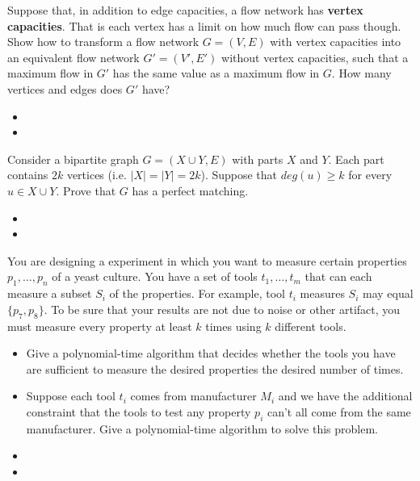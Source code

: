 \documentclass{article}
\newcounter{exercise}
\newcommand{\<}{
    \langle}
\renewcommand{\>}{
    \rangle}
\begin{document}
{\begin{exercise}
Suppose that, in addition to edge capacities, a flow network has \textbf{vertex capacities}.
That is each vertex has a limit on how much flow can pass though. Show how to transform a flow network $G=(V,E)$ with vertex capacities into an equivalent flow network $G'=(V',E')$ without vertex capacities, such that a maximum flow in $G'$ has the same value as a maximum flow in $G$. How many vertices and edges does $G'$ have?
\end{exercise}
\begin{itemize}
    \item 
    \item 
\end{itemize}




\begin{exercise}
Consider a bipartite graph $G=(X\cup Y,E)$ with parts $X$ and $Y$. Each part contains $2k$ vertices (i.e. $|X|=|Y|=2k$). Suppose that $deg(u)\geq k$ for every $u\in X\cup Y$. Prove that $G$ has a perfect matching.
\end{exercise}
\begin{itemize}
    \item 
    \item 
\end{itemize}




\begin{exercise}
You are designing a experiment in which you want to measure certain properties $p_1,\ldots ,p_n$ of a yeast culture. You have a set of tools $t_1,\ldots ,t_m$ that can each measure a subset $S_i$ of the properties. For example, tool $t_i$ measures $S_i$ may equal $\{p_7,p_8\}$. To be sure that your results are not due to noise or other artifact, you must measure every property at least $k$ times using $k$ different tools.
\begin{itemize}
\item Give a polynomial-time algorithm that decides whether the tools you have are sufficient to measure the desired properties the desired number of times.
\item Suppose each tool $t_i$ comes from manufacturer $M_i$ and we have the additional constraint that the tools to test any property $p_i$ can't all come from the same manufacturer. Give a polynomial-time algorithm to solve this problem.
\end{itemize}
\end{exercise}
\begin{itemize}
    \item 
    \item 
\end{itemize}




}
\end{document}
